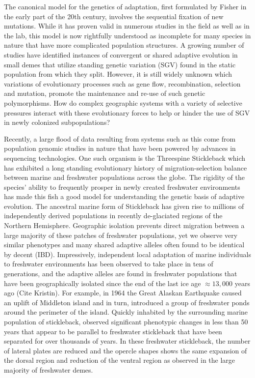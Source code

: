 \documentclass{article}
\begin{document}
The canonical model for the genetics of adaptation, first formulated by Fisher in the early part of the 20th century, involves the sequential fixation of new mutations. 
While it has proven valid in numerous studies in the field as well as in the lab, this model is now rightfully understood as incomplete for many species in nature that have more complicated population structures. 
A growing number of studies have identified instances of convergent or shared adaptive evolution in small demes that utilize standing genetic variation (SGV) found in the static population from which they split.
However, it is still widely unknown which variations of evolutionary processes such as gene flow, recombination, selection and mutation, promote the maintenance and re-use of such genetic polymorphisms.
How do complex geographic systems with a variety of selective pressures interact with these evolutionary forces to help or hinder the use of SGV in newly colonized subpopulations?

Recently, a large flood of data resulting from systems such as this come from population genomic studies in nature that have been powered by advances in sequencing technologies. 
One such organism is the Threespine Stickleback which has exhibited a long standing evolutionary history of migration-selection balance between marine and freshwater populations across the globe.
The rigidity of the species' ability to frequently prosper in newly created freshwater environments has made this fish a good model for understanding the genetic basis of adaptive evolution. 
The ancestral marine form of Stickleback has given rise to millions of independently derived populations in recently de-glaciated regions of the Northern Hemisphere.
Geographic isolation prevents direct migration between a large majority of these patches of freshwater populations,
yet we observe very similar phenotypes and many shared adaptive alleles often found to be identical by decent (IBD). 
Impressively, independent local adaptation of marine individuals to freshwater environments has been observed to take place in tens of generations, 
and the adaptive alleles are found in freshwater populations that have been geographically isolated since the end of the last ice age $\approx 13,000$ years ago (Cite Kristin).
For example, in 1964 the Great Alaskan Earthquake caused an uplift of Middleton island and in turn, introduced a group of freshwater ponds around the perimeter of the island. 
Quickly inhabited by the surrounding marine population of stickleback, 
\citet{lescak2015evolution} observed significant phenotypic changes in less than 50 years that appear to be parallel to freshwater stickleback that have been separated for over thousands of years. 
In these freshwater stickleback, the number of lateral plates are reduced and the opercle shapes shows
the same expansion of the dorsal region and reduction of the ventral region as observed in the large majority of freshwater demes.
\end{document}
